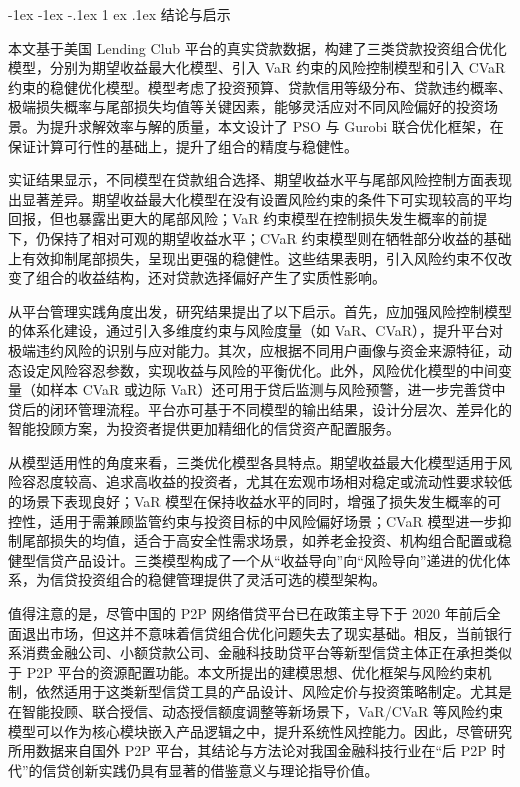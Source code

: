 \documentclass{write_paper}
\makeatletter
\renewcommand\section{\@startsection {section}{1}{\z@}%
                                   {-1ex \@plus -1ex \@minus -.1ex}%
                                   {1 ex \@plus.1ex}%
                                   {\normalfont\large\bfseries}}
\makeatother
\begin{document}
\section{结论与启示}
\label{sec:conclusion}

本文基于美国 Lending Club 平台的真实贷款数据，构建了三类贷款投资组合优化模型，分别为期望收益最大化模型、引入 VaR 约束的风险控制模型和引入 CVaR 约束的稳健优化模型。模型考虑了投资预算、贷款信用等级分布、贷款违约概率、极端损失概率与尾部损失均值等关键因素，能够灵活应对不同风险偏好的投资场景。为提升求解效率与解的质量，本文设计了 PSO 与 Gurobi 联合优化框架，在保证计算可行性的基础上，提升了组合的精度与稳健性。

实证结果显示，不同模型在贷款组合选择、期望收益水平与尾部风险控制方面表现出显著差异。期望收益最大化模型在没有设置风险约束的条件下可实现较高的平均回报，但也暴露出更大的尾部风险；VaR 约束模型在控制损失发生概率的前提下，仍保持了相对可观的期望收益水平；CVaR 约束模型则在牺牲部分收益的基础上有效抑制尾部损失，呈现出更强的稳健性。这些结果表明，引入风险约束不仅改变了组合的收益结构，还对贷款选择偏好产生了实质性影响。

从平台管理实践角度出发，研究结果提出了以下启示。首先，应加强风险控制模型的体系化建设，通过引入多维度约束与风险度量（如 VaR、CVaR），提升平台对极端违约风险的识别与应对能力。其次，应根据不同用户画像与资金来源特征，动态设定风险容忍参数，实现收益与风险的平衡优化。此外，风险优化模型的中间变量（如样本 CVaR 或边际 VaR）还可用于贷后监测与风险预警，进一步完善贷中贷后的闭环管理流程。平台亦可基于不同模型的输出结果，设计分层次、差异化的智能投顾方案，为投资者提供更加精细化的信贷资产配置服务。

从模型适用性的角度来看，三类优化模型各具特点。期望收益最大化模型适用于风险容忍度较高、追求高收益的投资者，尤其在宏观市场相对稳定或流动性要求较低的场景下表现良好；VaR 模型在保持收益水平的同时，增强了损失发生概率的可控性，适用于需兼顾监管约束与投资目标的中风险偏好场景；CVaR 模型进一步抑制尾部损失的均值，适合于高安全性需求场景，如养老金投资、机构组合配置或稳健型信贷产品设计。三类模型构成了一个从“收益导向”向“风险导向”递进的优化体系，为信贷投资组合的稳健管理提供了灵活可选的模型架构。

值得注意的是，尽管中国的 P2P 网络借贷平台已在政策主导下于 2020 年前后全面退出市场，但这并不意味着信贷组合优化问题失去了现实基础。相反，当前银行系消费金融公司、小额贷款公司、金融科技助贷平台等新型信贷主体正在承担类似于 P2P 平台的资源配置功能。本文所提出的建模思想、优化框架与风险约束机制，依然适用于这类新型信贷工具的产品设计、风险定价与投资策略制定。尤其是在智能投顾、联合授信、动态授信额度调整等新场景下，VaR/CVaR 等风险约束模型可以作为核心模块嵌入产品逻辑之中，提升系统性风控能力。因此，尽管研究所用数据来自国外 P2P 平台，其结论与方法论对我国金融科技行业在“后 P2P 时代”的信贷创新实践仍具有显著的借鉴意义与理论指导价值。
\end{document}
